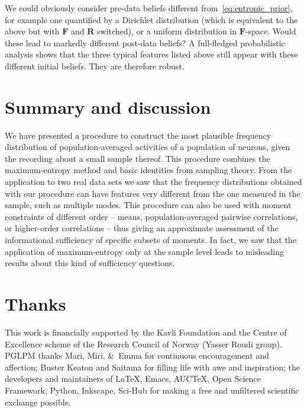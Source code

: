 \documentclass[\ifafour a4paper,12pt,\else a5paper,10pt,\fi%
onecolumn,oneside,article,%
british%
]{memoir}
\theoremstyle{remark}
\theoremstyle{innote}
\newcommand*{\amp}{\&}
\newenvironment{acknowledgements}{\section*{Thanks}\addcontentsline{toc}{section}{Thanks}}{\par}
\newcommand*\autanet{\texttt{[image: autanet.pdf]}}
\renewcommand*{\|}{\nonscript\,\vert\nonscript\;\mathopen{}}
\newcommand*{\yFF}{F}
\newcommand*{\yF}{\bm{\yFF}}
\newcommand*{\yRR}{R}
\newcommand*{\yR}{\bm{\yRR}}
\begin{document}
We could obviously consider pre-data beliefs different
from~\eqref{eq:entropic_prior}, for example one quantified by a Dirichlet
distribution (which is equivalent to the above but with $\yF$ and $\yR$
switched), or a uniform distribution in $\yF$-space. Would these lead to
markedly different post-data beliefs? A full-fledged probabilistic analysis
shows that the three typical features listed above still appear with these
different initial beliefs. They are therefore robust.




\section{Summary and discussion}
\label{sec:summary_discussion}

We have presented a procedure to construct the most plausible frequency
distribution of population-averaged activities of a population of neurons,
given the recording about a small sample thereof. This procedure combines
the maximum-entropy method and basic identities from sampling theory. From
the application to two real data sets we saw that the frequency
distributions obtained with our procedure can have features very different
from the one measured in the sample, such as multiple modes. This procedure
can also be used with moment constraints of different order -- means,
population-averaged pairwise correlations, or higher-order correlations --
thus giving an approximate assessment of the informational sufficiency of
specific subsets of moments. In fact, we saw that the application of
maximum-entropy only at the sample level leads to misleading results about
this kind of sufficiency questions.






\begin{acknowledgements}
  This work is financially supported by the Kavli Foundation and the Centre
  of Excellence scheme of the  Research Council of Norway (Yasser Roudi group).\\
  PGLPM thanks Mari, Miri, \amp\ Emma for continuous encouragement and
  affection; Buster Keaton and Saitama for filling life with awe and
  inspiration; the developers and maintainers of \LaTeX, Emacs, AUC\TeX,
  Open Science Framework, Python, Inkscape, Sci-Hub for making a free and
  unfiltered scientific exchange possible.
\end{acknowledgements}
\end{document}
